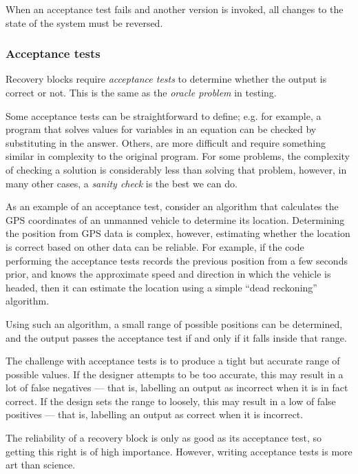 When an acceptance test fails and another version is invoked, all changes to the state of the system must be reversed.

\subsubsection*{Acceptance tests}

Recovery blocks require \emph{acceptance tests} to determine whether the output is correct or not. This is the same as the {\em oracle problem} in testing.

Some acceptance tests can be straightforward to define; e.g. for example, a program that solves values for variables in an equation can be checked by substituting in the answer. Others, are more difficult and require something similar in complexity to the original program. For some problems, the complexity of checking a solution is considerably less than solving that problem, however, in many other cases, a {\em sanity check} is the best we can do.

\begin{example}
\label{ex:fault-tolerance:acceptance-test-gps}
As an example of an acceptance test, consider an algorithm that calculates the GPS coordinates of an unmanned vehicle to determine its location. Determining the position from GPS data is complex, however, estimating whether the location is correct based on other data can be reliable. For example, if the code performing the acceptance tests records the previous position from a few seconds prior, and knows the approximate speed and direction in which the vehicle is headed, then it can estimate the location using a simple ``dead reckoning'' algorithm.

Using such an algorithm, a small range of possible positions can be determined, and the output passes the acceptance test if and only if it falls inside that range.

\end{example}

The challenge with acceptance tests is to produce a tight but accurate range of possible values. If the designer attempts to be too accurate, this may result in a lot of false negatives --- that is, labelling an output as incorrect when it is in fact correct. If the design sets the range to loosely, this may result in a low of false positives --- that is, labelling an output as correct when it is incorrect.

The reliability of a recovery block is only as good as its acceptance test, so getting this right is of high importance. However, writing acceptance tests is more art than science.

